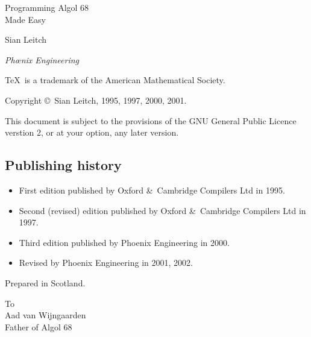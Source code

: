 %
%
%
\thispagestyle{empty}
\vglue 20mm
\begin{center}
\Huge Programming Algol 68\\ Made Easy
\end{center}
\vskip 10mm
\begin{center}
\Large Sian Leitch
\end{center}
\vfill
\begin{center}
\emph{Ph\oe{}nix Engineering}
\end{center}
\newpage
\thispagestyle{empty}
\parindent=0mm
\vfill
\small
\TeX\ is a trademark of the American Mathematical Society.\par
\smallskip
Copyright \copyright\ Sian Leitch, 1995, 1997, 2000, 2001.\par
\medskip
This document is subject to the provisions of the GNU General Public
Licence verstion 2, or at your option, any later version.\par
\bigskip
\subsection*{Publishing history}
\begin{itemize}
\item First edition published by Oxford \&\ Cambridge Compilers Ltd
in 1995.
\item Second (revised) edition published by Oxford \&\ Cambridge
Compilers Ltd in 1997.
\item Third edition published by Phoenix Engineering in 2000.
\item Revised by Phoenix Engineering in 2001, 2002.
\end{itemize}
\vfill
Prepared in Scotland.
\newpage
\thispagestyle{empty}
\vglue 40mm
\begin{flushright}
\textsf To\\
\medskip
\Large Aad van Wijngaarden\\
\bigskip\medskip
\normalsize Father of Algol 68
\end{flushright}
\newpage
